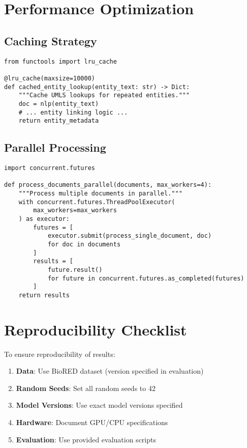 \section{Performance Optimization}

\subsection{Caching Strategy}
\begin{verbatim}
from functools import lru_cache

@lru_cache(maxsize=10000)
def cached_entity_lookup(entity_text: str) -> Dict:
    """Cache UMLS lookups for repeated entities."""
    doc = nlp(entity_text)
    # ... entity linking logic ...
    return entity_metadata
\end{verbatim}

\subsection{Parallel Processing}
\begin{verbatim}
import concurrent.futures

def process_documents_parallel(documents, max_workers=4):
    """Process multiple documents in parallel."""
    with concurrent.futures.ThreadPoolExecutor(
        max_workers=max_workers
    ) as executor:
        futures = [
            executor.submit(process_single_document, doc) 
            for doc in documents
        ]
        results = [
            future.result() 
            for future in concurrent.futures.as_completed(futures)
        ]
    return results
\end{verbatim}

\section{Reproducibility Checklist}

To ensure reproducibility of results:

\begin{enumerate}
    \item \textbf{Data}: Use BioRED dataset (version specified in evaluation)
    \item \textbf{Random Seeds}: Set all random seeds to 42
    \item \textbf{Model Versions}: Use exact model versions specified
    \item \textbf{Hardware}: Document GPU/CPU specifications
    \item \textbf{Evaluation}: Use provided evaluation scripts
\end{enumerate}

